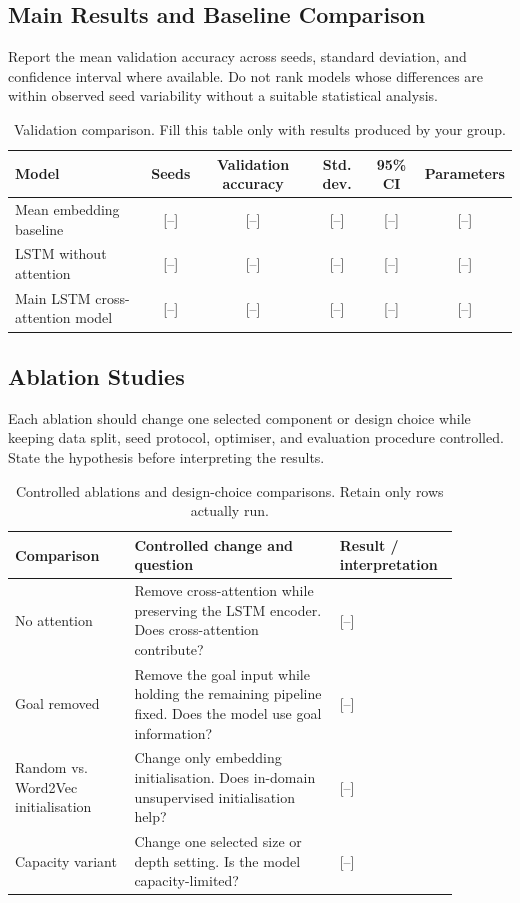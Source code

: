\documentclass[11pt]{article}
\begin{document}
\subsection{Main Results and Baseline Comparison}

Report the mean validation accuracy across seeds, standard deviation, and confidence interval where available. Do not rank models whose differences are within observed seed variability without a suitable statistical analysis.

\begin{table}[t]
\centering
\small
\caption{Validation comparison. Fill this table only with results produced by your group.}
\label{tab:main-results}
\begin{tabular}{@{}lccccc@{}}
\toprule
Model & Seeds & Validation accuracy & Std. dev. & 95\% CI & Parameters \\
\midrule
Mean embedding baseline & [--] & [--] & [--] & [--] & [--] \\
LSTM without attention & [--] & [--] & [--] & [--] & [--] \\
Main LSTM cross-attention model & [--] & [--] & [--] & [--] & [--] \\
\bottomrule
\end{tabular}
\end{table}

\subsection{Ablation Studies}

Each ablation should change one selected component or design choice while keeping data split, seed protocol, optimiser, and evaluation procedure controlled. State the hypothesis before interpreting the results.

\begin{table}[t]
\centering
\small
\caption{Controlled ablations and design-choice comparisons. Retain only rows actually run.}
\label{tab:ablations}
\begin{tabular}{@{}p{0.25\linewidth}p{0.43\linewidth}p{0.20\linewidth}@{}}
\toprule
Comparison & Controlled change and question & Result / interpretation \\
\midrule
No attention & Remove cross-attention while preserving the LSTM encoder. Does cross-attention contribute? & [--] \\
Goal removed & Remove the goal input while holding the remaining pipeline fixed. Does the model use goal information? & [--] \\
Random vs. Word2Vec initialisation & Change only embedding initialisation. Does in-domain unsupervised initialisation help? & [--] \\
Capacity variant & Change one selected size or depth setting. Is the model capacity-limited? & [--] \\
\bottomrule
\end{tabular}
\end{table}
\end{document}
